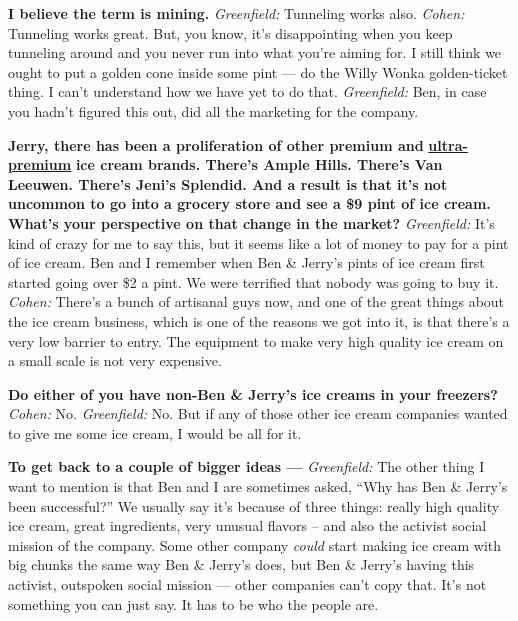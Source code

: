 \textbf{I believe the term is mining.} \emph{Greenfield:} Tunneling
works also. \emph{Cohen:} Tunneling works great. But, you know, it's
disappointing when you keep tunneling around and you never run into what
you're aiming for. I still think we ought to put a golden cone inside
some pint --- do the Willy Wonka golden-ticket thing. I can't understand
how we have yet to do that. \emph{Greenfield:} Ben, in case you hadn't
figured this out, did all the marketing for the company.

\textbf{Jerry, there has been a proliferation of other premium and}
\textbf{\href{http://nytimes3xbfgragh.onion\#tooltip-9}{ultra-premium}}
\textbf{ice cream brands. There's Ample Hills. There's Van Leeuwen.
There's Jeni's Splendid. And a result is that it's not uncommon to go
into a grocery store and see a \$9 pint of ice cream. What's your
perspective on that change in the market?} \emph{Greenfield:} It's kind
of crazy for me to say this, but it seems like a lot of money to pay for
a pint of ice cream. Ben and I remember when Ben \& Jerry's pints of ice
cream first started going over \$2 a pint. We were terrified that nobody
was going to buy it. \emph{Cohen:} There's a bunch of artisanal guys
now, and one of the great things about the ice cream business, which is
one of the reasons we got into it, is that there's a very low barrier to
entry. The equipment to make very high quality ice cream on a small
scale is not very expensive.

\textbf{Do either of you have non-Ben \& Jerry's ice creams in your
freezers?} \emph{Cohen:} No. \emph{Greenfield:} No. But if any of those
other ice cream companies wanted to give me some ice cream, I would be
all for it.

\textbf{To get back to a couple of bigger ideas ---} \emph{Greenfield:}
The other thing I want to mention is that Ben and I are sometimes asked,
``Why has Ben \& Jerry's been successful?'' We usually say it's because
of three things: really high quality ice cream, great ingredients, very
unusual flavors -- and also the activist social mission of the company.
Some other company \emph{could} start making ice cream with big chunks
the same way Ben \& Jerry's does, but Ben \& Jerry's having this
activist, outspoken social mission --- other companies can't copy that.
It's not something you can just say. It has to be who the people are.

